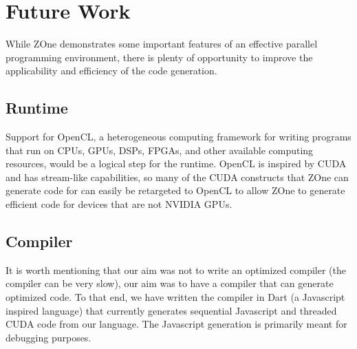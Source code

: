 \section{Future Work}

While ZOne demonstrates some important features of an effective parallel
programming environment, there is plenty of opportunity to improve the
applicability and efficiency of the code generation.

\subsection{Runtime}

Support for OpenCL, a heterogeneous computing framework for writing programs
that run
on CPUs, GPUs, DSPs, FPGAs, and other available computing resources, would be a
logical step for the runtime. OpenCL is inspired by CUDA and has stream-like
capabilities, so many of the CUDA constructs that ZOne can
generate code for can easily be retargeted to OpenCL to allow ZOne to generate
efficient code for devices that are not NVIDIA GPUs. 

\subsection{Compiler}

It is worth mentioning that our aim was not to write an optimized
compiler (the compiler can be very slow), our aim was to have a compiler
that can generate optimized code. To that end, we have written the
compiler in Dart (a Javascript inspired language) that currently
generates sequential Javascript and threaded CUDA code from our language.
The Javascript
generation is primarily meant for debugging purposes.

